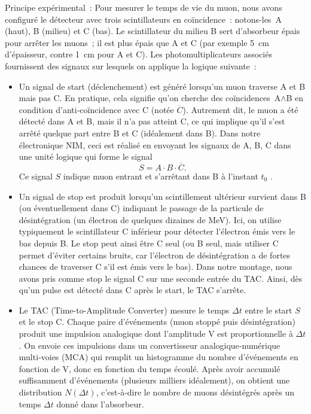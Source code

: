 \documentclass[a4paper,12pt,twoside]{article}
\begin{document}
Principe expérimental~: Pour mesurer le temps de vie du muon, nous avons configuré le détecteur avec trois scintillateurs en coïncidence~: notons-les~A (haut), B (milieu) et C (bas). Le scintillateur du milieu B sert d'absorbeur épais pour arrêter les muons~; il est plus épais que A et C (par exemple 5~cm d'épaisseur, contre 1~cm pour A et C). Les photomultiplicateurs associés fournissent des signaux sur lesquels on applique la logique suivante~:
\begin{itemize}
  \item Un signal de start (déclenchement) est généré lorsqu'un muon traverse A et B mais pas C. En pratique, cela signifie qu'on cherche des coïncidences~A\(\land\)B en condition d'anti‑coïncidence avec C (notée \(\overline{C}\)). Autrement dit, le muon a été détecté dans A et B, mais il n'a pas atteint C, ce qui implique qu'il s'est arrêté quelque part entre B et C (idéalement dans B). Dans notre électronique NIM, ceci est réalisé en envoyant les signaux de A, B, C dans une unité logique qui forme le signal
  \[
    S = A \cdot B \cdot \overline{C}.
  \]
  Ce signal \(S\) indique \og muon entrant et s'arrêtant dans B à l'instant \(t_0\) \fg{}.

  \item Un signal de stop est produit lorsqu'un scintillement ultérieur survient dans B (ou éventuellement dans C) indiquant le passage de la particule de désintégration (un électron de quelques dizaines de MeV). Ici, on utilise typiquement le scintillateur C inférieur pour détecter l'électron émis vers le bas depuis B. Le stop peut ainsi être C seul (ou B seul, mais utiliser C permet d'éviter certains bruits, car l'électron de désintégration a de fortes chances de traverser C s'il est émis vers le bas). Dans notre montage, nous avons pris comme stop le signal C sur une seconde entrée du TAC. Ainsi, dès qu'un pulse est détecté dans C après le start, le TAC s'arrête.

  \item Le TAC (Time-to-Amplitude Converter) mesure le temps \(\Delta t\) entre le start \(S\) et le stop C. Chaque paire d'événements (muon stoppé puis désintégration) produit une impulsion analogique dont l'amplitude V est proportionnelle à \(\Delta t\). On envoie ces impulsions dans un convertisseur analogique‑numérique multi‑voies (MCA) qui remplit un histogramme du nombre d'événements en fonction de V, donc en fonction du temps écoulé. Après avoir accumulé suffisamment d'événements (plusieurs milliers idéalement), on obtient une distribution \(N(\Delta t)\), c'est‑à‑dire le nombre de muons désintégrés après un temps \(\Delta t\) donné dans l'absorbeur.
\end{itemize}
\end{document}

